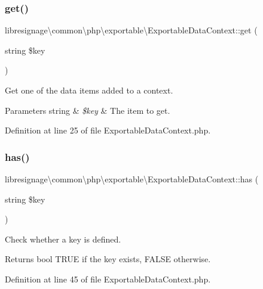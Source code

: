 \subsubsection{\texorpdfstring{get()}{get()}}
{\footnotesize\ttfamily libresignage\textbackslash{}common\textbackslash{}php\textbackslash{}exportable\textbackslash{}\+Exportable\+Data\+Context\+::get (\begin{DoxyParamCaption}\item[{string}]{\$key }\end{DoxyParamCaption})}

Get one of the data items added to a context.


\begin{DoxyParams}[1]{Parameters}
string & {\em \$key} & The item to get. \\
\hline
\end{DoxyParams}


Definition at line 25 of file Exportable\+Data\+Context.\+php.

\mbox{\label{classlibresignage_1_1common_1_1php_1_1exportable_1_1ExportableDataContext_a71ca50bc02fe6ba3451987bea83fd0fa}} 
\subsubsection{\texorpdfstring{has()}{has()}}
{\footnotesize\ttfamily libresignage\textbackslash{}common\textbackslash{}php\textbackslash{}exportable\textbackslash{}\+Exportable\+Data\+Context\+::has (\begin{DoxyParamCaption}\item[{string}]{\$key }\end{DoxyParamCaption})}

Check whether a key is defined.

\begin{DoxyReturn}{Returns}
bool T\+R\+UE if the key exists, F\+A\+L\+SE otherwise. 
\end{DoxyReturn}


Definition at line 45 of file Exportable\+Data\+Context.\+php.


